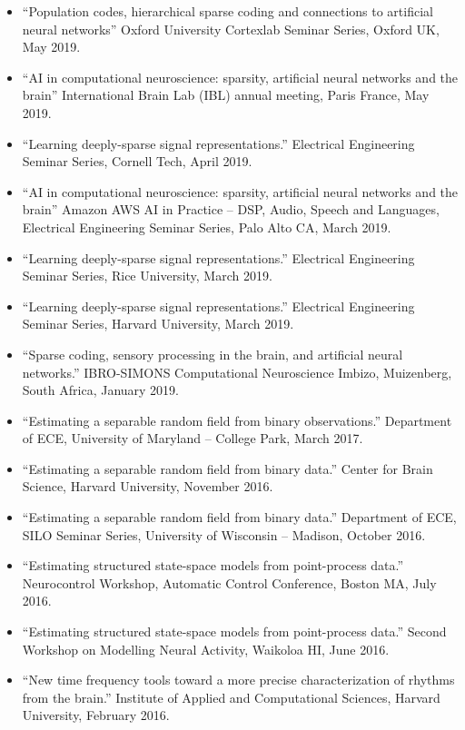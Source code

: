 \begin{itemize}
	\item ``Population codes, hierarchical sparse coding and connections to artificial neural networks''  Oxford University Cortexlab Seminar Series, Oxford UK, May 2019.
	\item ``AI in computational neuroscience: sparsity, artificial neural networks and the brain''  International Brain Lab (IBL) annual meeting, Paris France, May 2019.
	\item ``Learning deeply-sparse signal representations.''  Electrical Engineering Seminar Series, Cornell Tech, April 2019.
	\item ``AI in computational neuroscience: sparsity, artificial neural networks and the brain''  Amazon AWS AI in Practice -- DSP, Audio, Speech and Languages, Electrical Engineering Seminar Series, Palo Alto CA, March 2019.
	\item ``Learning deeply-sparse signal representations.''  Electrical Engineering Seminar Series, Rice University, March 2019.
	\item ``Learning deeply-sparse signal representations.''  Electrical Engineering Seminar Series, Harvard University, March 2019.
	\item ``Sparse coding, sensory processing in the brain, and artificial neural networks.'' IBRO-SIMONS Computational Neuroscience Imbizo, Muizenberg, South Africa, January 2019.
	\item ``Estimating a separable random field from binary observations.'' Department of ECE, University of Maryland -- College Park, March 2017.
    \item ``Estimating a separable random field from binary data.'' Center for Brain Science, Harvard University, November 2016.
    \item ``Estimating a separable random field from binary data.'' Department of ECE, SILO Seminar Series, University of Wisconsin -- Madison, October 2016.
   	\item ``Estimating structured state-space models from point-process data.'' Neurocontrol Workshop, Automatic Control Conference, Boston MA, July 2016.
    \item ``Estimating structured state-space models from point-process data.'' Second Workshop on Modelling Neural Activity, Waikoloa HI, June 2016.
    \item ``New time frequency tools toward a more precise characterization of rhythms from the brain.'' Institute of Applied and Computational Sciences, Harvard University, February 2016.

\end{itemize}
